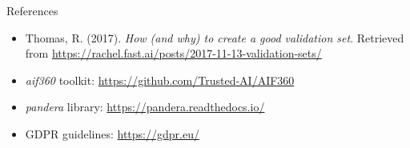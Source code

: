 \documentclass[aspectratio=169]{beamer}
\begin{document}
\begin{frame}{References}
\footnotesize
\begin{itemize}
\item Thomas, R. (2017). \textit{How (and why) to create a good validation set}. Retrieved from \url{https://rachel.fast.ai/posts/2017-11-13-validation-sets/}
\item \textit{aif360} toolkit: \url{https://github.com/Trusted-AI/AIF360}
\item \textit{pandera} library: \url{https://pandera.readthedocs.io/}
\item GDPR guidelines: \url{https://gdpr.eu/}
\end{itemize}
\end{frame}
\end{document}
